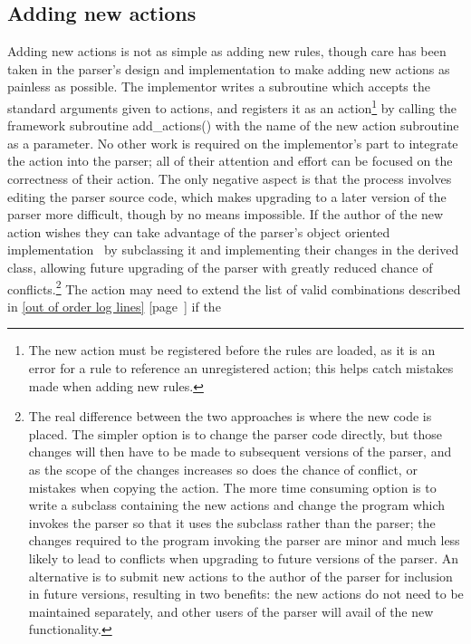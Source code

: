 \documentclass[a4paper,12pt,draft]{article}
\newcommand{\refwithpage}[1]{%
    \empty{}\ref{#1} [page~\pageref{#1}]%
}
\newcommand{\sectionref}[1]{%
    \textsection{}\refwithpage{#1}%
}
\begin{document}
\subsection{Adding new actions}

\label{adding new actions}

Adding new actions is not as simple as adding new rules, though care has
been taken in the parser's design and implementation to make adding new
actions as painless as possible.  The implementor writes a subroutine which
accepts the standard arguments given to actions, and registers it as an
action\footnote{The new action must be registered before the rules are
loaded, as it is an error for a rule to reference an unregistered action;
this helps catch mistakes made when adding new rules.} by calling the
framework subroutine add\_actions() with the name of the new action
subroutine as a parameter.  No other work is required on the implementor's
part to integrate the action into the parser; all of their attention and
effort can be focused on the correctness of their action.  The only
negative aspect is that the process involves editing the parser source
code, which makes upgrading to a later version of the parser more
difficult, though by no means impossible.  If the author of the new action
wishes they can take advantage of the parser's object oriented
implementation~\cite{Wikipedia-object-orientation} by subclassing it and
implementing their changes in the derived class, allowing future upgrading
of the parser with greatly reduced chance of conflicts.\footnote{The real
difference between the two approaches is where the new code is placed.  The
simpler option is to change the parser code directly, but those changes
will then have to be made to subsequent versions of the parser, and as the
scope of the changes increases so does the chance of conflict, or mistakes
when copying the action.  The more time consuming option is to write a
subclass containing the new actions and change the program which invokes
the parser so that it uses the subclass rather than the parser; the changes
required to the program invoking the parser are minor and much less likely
to lead to conflicts when upgrading to future versions of the parser.  An
alternative is to submit new actions to the author of the parser for
inclusion in future versions, resulting in two benefits: the new actions do
not need to be maintained separately, and other users of the parser will
avail of the new functionality.} The action may need to extend the list of
valid combinations described in \sectionref{out of order log lines} if the
\end{document}
